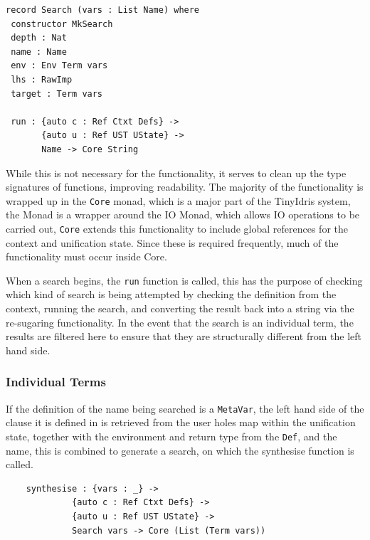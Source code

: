 \documentclass[a4paper]{article}
\begin{document}
\begin{center}
  \begin{verbatim}
record Search (vars : List Name) where
 constructor MkSearch
 depth : Nat
 name : Name
 env : Env Term vars
 lhs : RawImp
 target : Term vars 

 run : {auto c : Ref Ctxt Defs} -> 
       {auto u : Ref UST UState} ->
       Name -> Core String
  \end{verbatim}
\end{center}

While this is not necessary for the functionality, it serves
to clean up the type signatures of functions, improving readability. 
The majority of the functionality is wrapped up in the \texttt{Core}
monad, which is a major part of the TinyIdris system, the Monad
is a wrapper around the IO Monad, which allows IO operations to be
carried out, \texttt{Core} extends this functionality to include
global references for the context and unification state. Since these
is required frequently, much of the functionality must occur inside
Core. 

When a search begins, the \texttt{run} function is called, this
has the purpose of checking which kind of search is being attempted by
checking the definition from the context, running the search, and
converting the result back into a string via the re-sugaring
functionality. In the event that the search is an individual term,
the results are filtered here to ensure that they are structurally
different from the left hand side.

\subsubsection{Individual Terms}
If the definition of the name being searched is a \texttt{MetaVar},
the left hand side of the clause it is defined in is retrieved from
the user holes map within the unification state, together with the
environment and return type from the \texttt{Def}, and the name,
this is combined to generate a search, on which the synthesise function
is called.

\begin{center}
  \begin{verbatim}
    synthesise : {vars : _} -> 
             {auto c : Ref Ctxt Defs} -> 
             {auto u : Ref UST UState} ->
             Search vars -> Core (List (Term vars))
  \end{verbatim}
\end{center}
\end{document}
